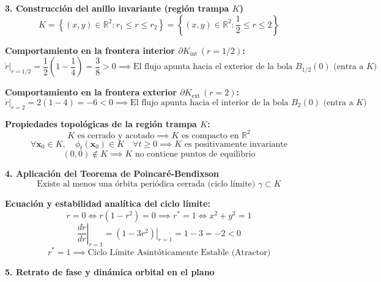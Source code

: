 \documentclass[11pt,a4paper]{article}
\newenvironment{solucion}[1][Solución Detallada]{%
    \vspace{1.5mm}%
    \noindent{\large\textbf{Solución:}}\par\vspace{1.5mm}%
}{%
    \par\vspace{3mm}%
}
\begin{document}
\begin{solucion}
\textbf{\large 3. Construcción del anillo invariante (región trampa $K$)}
\[
K = \left\{(x, y) \in \mathbb{R}^2 : r_1 \le r \le r_2\right\} = \left\{(x, y) \in \mathbb{R}^2 : \frac{1}{2} \le r \le 2\right\}
\]

\textbf{Comportamiento en la frontera interior $\partial K_{\text{int}} \, (r = 1/2)$:}
\[
\left.\dot{r}\right|_{r=1/2} = \frac{1}{2}\left(1 - \frac{1}{4}\right) = \frac{3}{8} > 0 \implies \boxed{\text{El flujo apunta hacia el exterior de la bola } B_{1/2}(0) \text{ (entra a } K)}
\]

\textbf{Comportamiento en la frontera exterior $\partial K_{\text{ext}} \, (r = 2)$:}
\[
\left.\dot{r}\right|_{r=2} = 2(1 - 4) = -6 < 0 \implies \boxed{\text{El flujo apunta hacia el interior de la bola } B_2(0) \text{ (entra a } K)}
\]

\textbf{Propiedades topológicas de la región trampa $K$:}
\[
K \text{ es cerrado y acotado} \implies \boxed{K \text{ es compacto en } \mathbb{R}^2}
\]
\[
\forall \mathbf{x}_0 \in K, \quad \phi_t(\mathbf{x}_0) \in K \quad \forall t \ge 0 \implies \boxed{K \text{ es positivamente invariante}}
\]
\[
(0, 0) \notin K \implies \boxed{K \text{ no contiene puntos de equilibrio}}
\]

\vspace{3.5mm}

\textbf{\large 4. Aplicación del Teorema de Poincaré-Bendixson}
\[
\boxed{\text{Existe al menos una órbita periódica cerrada (ciclo límite) } \gamma \subset K}
\]

\textbf{Ecuación y estabilidad analítica del ciclo límite:}
\[
\dot{r} = 0 \iff r(1 - r^2) = 0 \implies \boxed{r^* = 1 \iff x^2 + y^2 = 1}
\]
\[
\left.\frac{d\dot{r}}{dr}\right|_{r=1} = \left.(1 - 3r^2)\right|_{r=1} = 1 - 3 = -2 < 0
\]
\[
\boxed{r^* = 1 \implies \text{Ciclo Límite Asintóticamente Estable (Atractor)}}
\]

\vspace{3.5mm}

\textbf{\large 5. Retrato de fase y dinámica orbital en el plano}

\begin{center}
\end{center}
\end{solucion}
\end{document}

